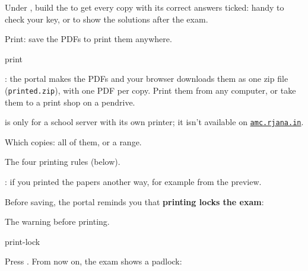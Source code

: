 \documentclass[11pt]{article}
\newcommand\portal{\href{https://amc.rjana.in}{\texttt{amc.rjana.in}}}
\begin{document}
\begin{tip}
Under , build the  to get every copy with its correct answers ticked: handy to check your key, or to show the solutions after the exam.
\end{tip}

\label{step:print}

\begin{keep}
\begin{guidefig}{Print: save the PDFs to print them anywhere.}
\begin{shot}{print}
\end{shot}
\end{guidefig}
\begin{callouts}
  \item {}: the portal makes the PDFs and your browser downloads them as one zip file (\texttt{printed.zip}), with one PDF per copy. Print them from any computer, or take them to a print shop on a pendrive.
  \item {} is only for a school server with its own printer; it isn't available on \portal.
  \item Which copies: all of them, or a range.
  \item The four printing rules (below).
  \item {}
  \item {}: if you printed the papers another way, for example from the preview.
\end{callouts}
\end{keep}

Before saving, the portal reminds you that \textbf{printing locks the exam}:

\begin{guidefig}{The warning before printing.}
\begin{shot}[0.55\linewidth]{print-lock}
\end{shot}
\end{guidefig}

Press  . From now on, the exam shows a padlock:
\end{document}
